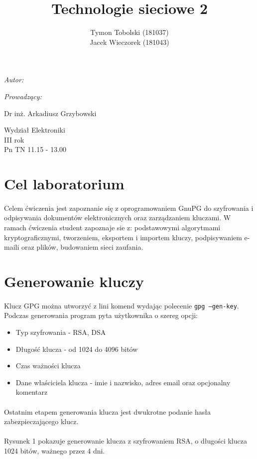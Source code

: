 \documentclass[wide,a4paper,titlepage,12pt] {article}
\title{Technologie sieciowe 2}
\author{Tymon Tobolski (181037)\\ Jacek Wieczorek (181043)}
\makeatletter
\renewcommand{\maketitle}{
\begin{titlepage}
  \begin{center}
    \vspace*{3cm}
    \LARGE \@title \par
    \vspace{2cm}
    \textit{\small Autor:}\par
    \normalsize \@author\par \normalsize
    \vspace{3cm}
    \textit{\small Prowadzący:}\par
    Dr inż. Arkadiusz Grzybowski\par
    \vspace{2cm}
    Wydział Elektroniki\\ III rok\\ Pn TN 11.15 - 13.00\par
    \vspace{4cm}
    \small \@date
  \end{center}
\end{titlepage}
}
\makeatother
\begin{document}
\maketitle
  \section{Cel laboratorium}
  \paragraph{}
  Celem ćwiczenia jest zapoznanie się z oprogramowaniem GnuPG do szyfrowania i odpisywania dokumentów elektronicznych oraz zarządzaniem kluczami. W ramach ćwiczenia student zapoznaje sie z: podstawowymi algorytmami kryptograficznymi, tworzeniem, eksportem i importem kluczy, podpisywaniem e-maili oraz plików, budowaniem sieci zaufania.


  \section{Generowanie kluczy}
  \paragraph{}
  Klucz GPG można utworzyć z lini komend wydając polecenie \texttt{gpg --gen-key}.
  Podczas generowania program pyta użytkownika o szereg opcji:

  \begin{itemize}
    \item Typ szyfrowania - RSA, DSA
    \item Długość klucza - od 1024 do 4096 bitów
    \item Czas ważności klucza
    \item Dane właściciela klucza - imie i nazwisko, adres email oraz opcjonalny komentarz
  \end{itemize}

  \paragraph{}
  Ostatnim etapem generowania klucza jest dwukrotne podanie hasła zabezpieczającego klucz.

  \paragraph{}
  Rysunek 1 pokazuje generowanie klucza z szyfrowaniem RSA, o długości klucza 1024 bitów, ważnego przez 4 dni.
\end{document}
